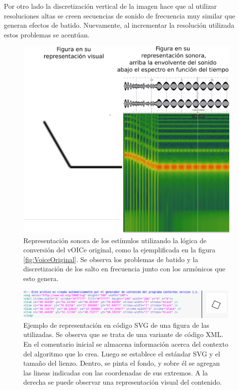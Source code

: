 \documentclass{article}
\numberwithin{figure}{section}
\begin{document}
    Por otro lado la discretización vertical de la imagen hace que al utilizar resoluciones altas se creen secuencias de sonido de frecuencia muy similar que generan efectos de batido. Nuevamente, al incrementar la resolución utilizada estos problemas se acentúan. 
    
    
    \begin{figure}
        \center
        \includegraphics[width=\textwidth]{Imagenes/vOICeOriginal.png}
        \caption{Representación sonora de los estímulos utilizando la lógica de conversión del vOICe original, como la ejemplificada en la figura \ref{fig:VoiceOriginal}. Se observa los problemas de batido y la discretización de los salto en frecuencia junto con los armónicos que esto genera.}
        \label{fig:vOICeOriginal}
    \end{figure}
    
    \begin{figure}
        \center
        \includegraphics[width=\textwidth]{Imagenes/678SVG.png}
        \caption{Ejemplo de representación en código SVG de una figura de las utilizadas. Se observa que se trata de una variante de código XML. En el comentario inicial se almacena información acerca del contexto del algoritmo que lo crea. Luego se establece el estándar SVG y el tamaño del lienzo. Dentro, se pinta el fondo, y sobre él se agregan las lineas indicadas con las coordenadas de sus extremos. A la derecha se puede observar una representación visual del contenido.}
        \label{fig:SVGtoPNG}
    \end{figure}
    
\end{document}
